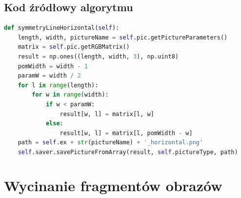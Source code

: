 \documentclass[a4paper,12pt, titlepage]{report}
\begin{document}
\subsection*{Kod źródłowy algorytmu}
\begin{lstlisting}[language=Python]
def symmetryLineHorizontal(self):
    length, width, pictureName = self.pic.getPictureParameters()
    matrix = self.pic.getRGBMatrix()
    result = np.ones((length, width, 3), np.uint8)
    pomWidth = width - 1
    paramW = width / 2
    for l in range(length):
        for w in range(width):
            if w < paramW:
                result[w, l] = matrix[l, w]
            else:
                result[w, l] = matrix[l, pomWidth - w]
    path = self.ex + str(pictureName) + '_horizontal.png'
    self.saver.savePictureFromArray(result, self.pictureType, path)
\end{lstlisting}

\section{Wycinanie fragmentów obrazów}
\end{document}
